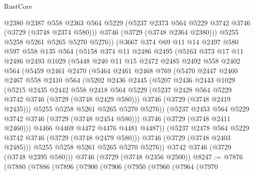 \begin{lexlean}{RustCore}
\begin{coremodule}
          @2380
          @2387
          @558
          @2363
          @564
          @5229
          (@5237 @2373 @564 @5229 @3742 @3746 (@3729 (@3748 @2374 @580)))
          @3746
          (@3729 (@3748 @2364 @2380)))
        @5255
        @5258
        @5261
        @5265
        @5270
        @5276))
    (@3667
      @374
      @69
      @11
      @14
      @2497
      @580
      @597
      @558
      @135
      @564
      (@5158
        @374
        @11
        @2486
        @2495
        (@5163
          @373
          @17
          @11
          @2486
          @2493
          @1029
          (@5448
            @240
            @11
            @15
            @2472
            @2485
            @2492
            @558
            @2402
            @564
            (@5459
              @2461
              @2470
              (@5464
                @2461
                @2468
                @769
                (@5470
                  @2447
                  @2460
                  @2467
                  @558
                  @2410
                  @564
                  (@5202
                    @2436
                    @2445
                    (@5207
                      @2436
                      @2443
                      @1029
                      (@5215
                        @2435
                        @2442
                        @558
                        @2418
                        @564
                        @5229
                        (@5237 @2428 @564 @5229 @3742 @3746 (@3729 (@3748 @2429 @580)))
                        @3746
                        (@3729 (@3748 @2419 @2435)))
                      @5255
                      @5258
                      @5261
                      @5265
                      @5270
                      @5276))
                  (@5237 @2453 @564 @5229 @3742 @3746 (@3729 (@3748 @2454 @580)))
                  @3746
                  (@3729 (@3748 @2411 @2460)))
                @4466
                @4469
                @4472
                @4476
                @4481
                @4487))
            (@5237 @2478 @564 @5229 @3742 @3746 (@3729 (@3748 @2479 @580)))
            @3746
            (@3729 (@3748 @2403 @2485)))
          @5255
          @5258
          @5261
          @5265
          @5270
          @5276))
      @3742
      @3746
      (@3729 (@3748 @2395 @580)))
    @3746
    (@3729 (@3748 @2356 @2500))
@8247 := @7876
    (@7880
      (@7886
        (@7896
          (@7900
            (@7906
              (@7950
                (@7960
                  (@7964
                    (@7970

\end{coremodule}
\end{lexlean}
